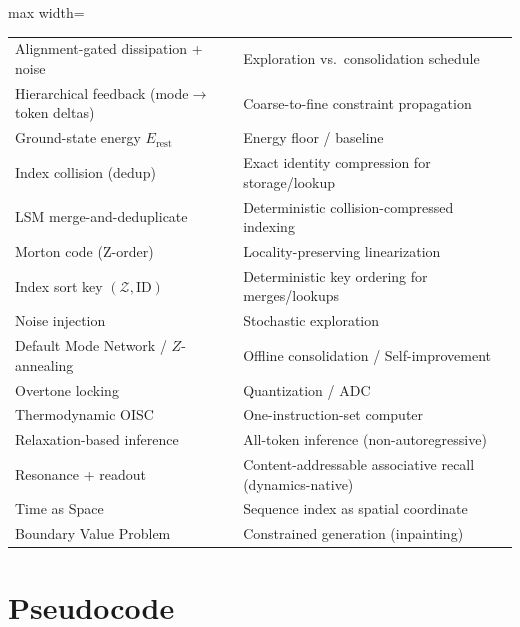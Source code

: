 \documentclass[11pt,a4paper]{article}
\begin{document}
\begin{center}
\begin{adjustbox}{max width=\textwidth}
\begin{tabular}{l l}
Alignment-gated dissipation + noise & Exploration vs.\ consolidation schedule \\
Hierarchical feedback (mode\(\to\)token deltas) & Coarse-to-fine constraint propagation \\
Ground-state energy $E_{\mathrm{rest}}$ & Energy floor / baseline \\
Index collision (dedup) & Exact identity compression for storage/lookup \\
LSM merge-and-deduplicate & Deterministic collision-compressed indexing \\
Morton code (Z-order) & Locality-preserving linearization \\
Index sort key \((\mathcal{Z},\text{ID})\) & Deterministic key ordering for merges/lookups \\
Noise injection & Stochastic exploration \\
Default Mode Network / $Z$-annealing & Offline consolidation / Self-improvement \\
Overtone locking & Quantization / ADC \\
Thermodynamic OISC & One-instruction-set computer \\
Relaxation-based inference & All-token inference (non-autoregressive) \\
Resonance + readout & Content-addressable associative recall (dynamics-native) \\
Time as Space & Sequence index as spatial coordinate \\
Boundary Value Problem & Constrained generation (inpainting) \\
\bottomrule
\end{tabular}
\end{adjustbox}
\end{center}

\section{Pseudocode}
\label{app:algorithms}
\end{document}
